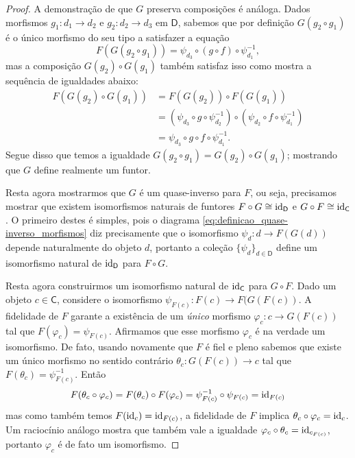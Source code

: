 \begin{proof}
  A demonstração de que $G$ preserva composições é análoga.
  Dados morfismos $g_{1}: d_{1} \to d_{2}$ e $g_{2}: d_{2} \to d_{3}$ em $\mathsf{D}$, sabemos que por definição $G(g_{2} \circ g_{1})$ é o único morfismo do seu tipo a satisfazer a equação
  \begin{displaymath}
    F(G(g_{2} \circ g_{1})) = \psi_{d_{3}} \circ (g \circ f) \circ \psi_{d_{1}}^{-1},
  \end{displaymath}
  mas a composição $G(g_{2}) \circ G(g_{1})$ também satisfaz isso como mostra a sequência de igualdades abaixo:
  \begin{align*}
    F(G(g_{2}) \circ G(g_{1}))
    & = F(G(g_{2})) \circ F(G(g_{1})) \\
    & = (\psi_{d_{3}} \circ g \circ \psi_{d_{2}}^{-1}) \circ (\psi_{d_{2}} \circ f \circ \psi_{d_{1}}^{-1}) \\
    & = \psi_{d_{3}} \circ g \circ f \circ \psi_{d_{1}}^{-1}.
  \end{align*}
  Segue disso que temos a igualdade $G(g_{2} \circ g_{1}) = G(g_{2}) \circ G(g_{1})$; mostrando que $G$ define realmente um funtor.

  Resta agora mostrarmos que $G$ é um quase-inverso para $F$, ou seja, precisamos mostrar que existem isomorfismos naturais de funtores $F \circ G \cong \mathrm{id}_{\mathsf{D}}$ e $G \circ F \cong \mathrm{id}_{\mathsf{C}}$.
  O primeiro destes é simples, pois o diagrama \eqref{eq:definicao_quase-inverso_morfismos} diz precisamente que o isomorfismo $\psi_{d}: d \to F(G(d))$ depende naturalmente do objeto $d$, portanto a coleção $\{\psi_{d}\}_{d \in \mathsf{D}}$ define um isomorfismo natural de $\mathrm{id}_{\mathsf{D}}$ para $F \circ G$.

  Resta agora construirmos um isomorfismo natural de $\mathrm{id}_{\mathsf{C}}$ para $G \circ F$.
  Dado um objeto $c \in \mathsf{C}$, considere o isomorfismo $\psi_{F(c)}: F(c) \to F(G(F(c))$.
  A fidelidade de $F$ garante a existência de um \emph{único} morfismo $\varphi_{c}: c \to G(F(c))$ tal que $F(\varphi_{c}) = \psi_{F(c)}$.
  Afirmamos que esse morfismo $\varphi_{c}$ é na verdade um isomorfismo.
  De fato, usando novamente que $F$ é fiel e pleno sabemos que existe um único morfismo no sentido contrário $\theta_{c}: G(F(c)) \to c$ tal que $F(\theta_{c}) = \psi_{F(c)}^{-1}$. Então
  \begin{displaymath}
    F(\theta_{c} \circ \varphi_{c}) = F(\theta_{c}) \circ F(\varphi_{c}) = \psi_{F(c)}^{-1} \circ \psi_{F(c)} = \mathrm{id}_{F(c)}
  \end{displaymath}
  mas como também temos $F(\mathrm{id}_{c}) = \mathrm{id}_{F(c)}$, a fidelidade de $F$ implica $\theta_{c} \circ \varphi_{c} = \mathrm{id}_{c}$.
  Um raciocínio análogo mostra que também vale a igualdade $\varphi_{c} \circ \theta_{c} = \mathrm{id}_{c_{F(c)}}$, portanto $\varphi_{c}$ é de fato um isomorfismo.


\end{proof}
